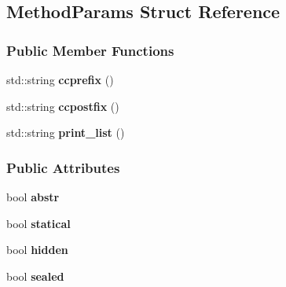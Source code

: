 \hypertarget{struct_method_params}{}\subsection{Method\+Params Struct Reference}
\label{struct_method_params}
\subsubsection*{Public Member Functions}
\begin{DoxyCompactItemize}
\item 
\hypertarget{struct_method_params_ac0d29d6dbe25896b7cf1375966e16de1}{}std\+::string {\bfseries ccprefix} ()\label{struct_method_params_ac0d29d6dbe25896b7cf1375966e16de1}

\item 
\hypertarget{struct_method_params_a93c81cf47b9296b60031afa34e1a92be}{}std\+::string {\bfseries ccpostfix} ()\label{struct_method_params_a93c81cf47b9296b60031afa34e1a92be}

\item 
\hypertarget{struct_method_params_af1309e46dd64a39cdef1f6d0b6abc14f}{}std\+::string {\bfseries print\+\_\+list} ()\label{struct_method_params_af1309e46dd64a39cdef1f6d0b6abc14f}

\end{DoxyCompactItemize}
\subsubsection*{Public Attributes}
\begin{DoxyCompactItemize}
\item 
\hypertarget{struct_method_params_a1fd035f50ebacbf2a683e05ea21e9262}{}bool {\bfseries abstr}\label{struct_method_params_a1fd035f50ebacbf2a683e05ea21e9262}

\item 
\hypertarget{struct_method_params_adb358cf3c2dd5d0ef4c877a707a8f088}{}bool {\bfseries statical}\label{struct_method_params_adb358cf3c2dd5d0ef4c877a707a8f088}

\item 
\hypertarget{struct_method_params_a8f576b8450cfa0cce9ac8f41b5714e92}{}bool {\bfseries hidden}\label{struct_method_params_a8f576b8450cfa0cce9ac8f41b5714e92}

\item 
\hypertarget{struct_method_params_ab1420db48b65337edd2b31a9dc274703}{}bool {\bfseries sealed}\label{struct_method_params_ab1420db48b65337edd2b31a9dc274703}

\end{DoxyCompactItemize}
